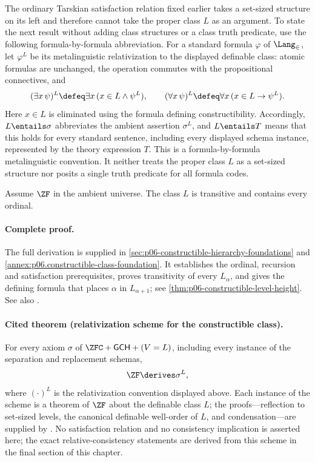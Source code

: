 The ordinary Tarskian satisfaction relation fixed earlier takes a set-sized
structure on its left and therefore cannot take the proper class \(L\) as an
argument.  To state the next result without adding class structures or a class
truth predicate, use the following formula-by-formula abbreviation.  For a
standard formula \(\varphi\) of \(\Lang_{\in}\), let
\(\varphi^L\) be its metalinguistic relativization to the displayed definable
class: atomic formulas are unchanged, the operation commutes with the
propositional connectives, and
\[
  (\exists x\,\psi)^L\defeq
    \exists x\,(x\in L\land\psi^L),
  \qquad
  (\forall x\,\psi)^L\defeq
    \forall x\,(x\in L\to\psi^L).
\]
Here \(x\in L\) is eliminated using the formula defining constructibility.
Accordingly, \(L\entails\sigma\) abbreviates the ambient assertion
\(\sigma^L\), and \(L\entails T\) means that this holds for every standard
sentence, including every displayed schema instance, represented by the
theory expression \(T\).  This is a formula-by-formula metalinguistic
convention.  It neither treats the proper class \(L\) as a set-sized structure
nor posits a single truth predicate for all formula codes.

\begin{theorem}
Assume \(\ZF\) in the ambient universe.  The class \(L\) is transitive and
contains every ordinal.
\end{theorem}

\paragraph{Complete proof.}
The full derivation is supplied in
\cref{sec:p06-constructible-hierarchy-foundations} and
\cref{annex:p06.constructible-class-foundation}. It establishes the
ordinal, recursion and satisfaction prerequisites, proves transitivity
of every \(L_\alpha\), and gives the defining formula that places
\(\alpha\) in \(L_{\alpha+1}\); see
\cref{thm:p06-constructible-level-height}. See also \cite{Jech2003}.

\paragraph{Cited theorem (relativization scheme for the constructible
class).}
For every axiom \(\sigma\) of \(\ZFC+\mathsf{GCH}+(V=L)\), including every
instance of the separation and replacement schemas,
\[
  \ZF\derives\sigma^{L},
\]
where \((\cdot)^{L}\) is the relativization convention displayed above.
Each instance of the scheme is a theorem of \(\ZF\) about the definable
class \(L\); the proofs---reflection to set-sized levels, the canonical
definable well-order of \(L\), and condensation---are supplied by
\cite[Chapter~13, pp.~175--200]{Jech2003}.  No satisfaction relation and no
consistency implication is asserted here; the exact relative-consistency
statements are derived from this scheme in the final section of this
chapter.
